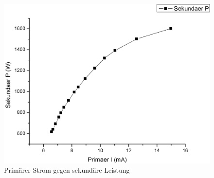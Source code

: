 \documentclass[12pt,a4paper]{article}
\begin{document}
\begin{figure}[H]
	\centering
	\includegraphics[scale=0.40]{./figure/transformator_pI_sP.png}
	\caption{Primärer Strom gegen sekundäre Leistung}
	\label{fig:trafo_pi_sp}
\end{figure}
\end{document}
